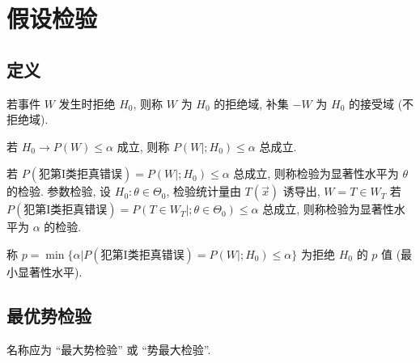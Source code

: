 \chapter{假设检验}

\section{定义}

若事件 $W$ 发生时拒绝 $H_0$, 则称 $W$ 为 $H_0$ 的拒绝域, 补集 $-W$ 为 $H_0$ 的接受域 (不拒绝域).

若 $H_0\rightarrow P(W)\le\alpha$ 成立, 则称 $P(W|;H_0)\le\alpha$ 总成立.

若 $P(\text{犯第I类拒真错误})=P(W|;H_0)\le\alpha$ 总成立, 则称检验为显著性水平为 $\theta$ 的检验. 参数检验, 设 $H_0:\theta\in\Theta_0$, 检验统计量由 $T(\vec{x})$ 诱导出, $W=T\in W_T$ 若 $P(\text{犯第I类拒真错误})=P(T\in W_T|;\theta\in\Theta_0)\le\alpha$ 总成立, 则称检验为显著性水平为 $\alpha$ 的检验.

称 $p=\min\{\alpha|P(\text{犯第I类拒真错误})=P(W|;H_0)\le\alpha\}$ 为拒绝 $H_0$ 的 $p$ 值 (最小显著性水平).

\section{最优势检验}

名称应为 ``最大势检验'' 或 ``势最大检验''.
